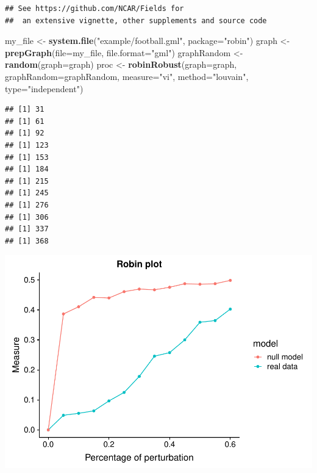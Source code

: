\documentclass[]{article}
\newenvironment{Shaded}{\begin{snugshade}}{\end{snugshade}}
\newcommand{\KeywordTok}[1]{\textcolor[rgb]{0.13,0.29,0.53}{\textbf{#1}}}
\newcommand{\DataTypeTok}[1]{\textcolor[rgb]{0.13,0.29,0.53}{#1}}
\newcommand{\StringTok}[1]{\textcolor[rgb]{0.31,0.60,0.02}{#1}}
\newcommand{\OperatorTok}[1]{\textcolor[rgb]{0.81,0.36,0.00}{\textbf{#1}}}
\newcommand{\NormalTok}[1]{#1}
\begin{document}
\begin{verbatim}
## See https://github.com/NCAR/Fields for
##  an extensive vignette, other supplements and source code
\end{verbatim}

\begin{Shaded}
\begin{Highlighting}[]
\NormalTok{my_file <-}\StringTok{ }\KeywordTok{system.file}\NormalTok{(}\StringTok{"example/football.gml"}\NormalTok{, }\DataTypeTok{package=}\StringTok{"robin"}\NormalTok{)}
\NormalTok{graph <-}\StringTok{ }\KeywordTok{prepGraph}\NormalTok{(}\DataTypeTok{file=}\NormalTok{my_file, }\DataTypeTok{file.format=}\StringTok{"gml"}\NormalTok{)}
\NormalTok{graphRandom <-}\StringTok{ }\KeywordTok{random}\NormalTok{(}\DataTypeTok{graph=}\NormalTok{graph)}
\NormalTok{proc <-}\StringTok{ }\KeywordTok{robinRobust}\NormalTok{(}\DataTypeTok{graph=}\NormalTok{graph, }\DataTypeTok{graphRandom=}\NormalTok{graphRandom, }\DataTypeTok{measure=}\StringTok{"vi"}\NormalTok{, }
                  \DataTypeTok{method=}\StringTok{"louvain"}\NormalTok{, }\DataTypeTok{type=}\StringTok{"independent"}\NormalTok{)}
\end{Highlighting}
\end{Shaded}

\begin{verbatim}
## [1] 31
## [1] 61
## [1] 92
## [1] 123
## [1] 153
## [1] 184
## [1] 215
## [1] 245
## [1] 276
## [1] 306
## [1] 337
## [1] 368
\end{verbatim}

\begin{Shaded}
\end{Shaded}

\includegraphics{Figure_Paper_files/figure-latex/unnamed-chunk-1-1.pdf}
\end{document}
